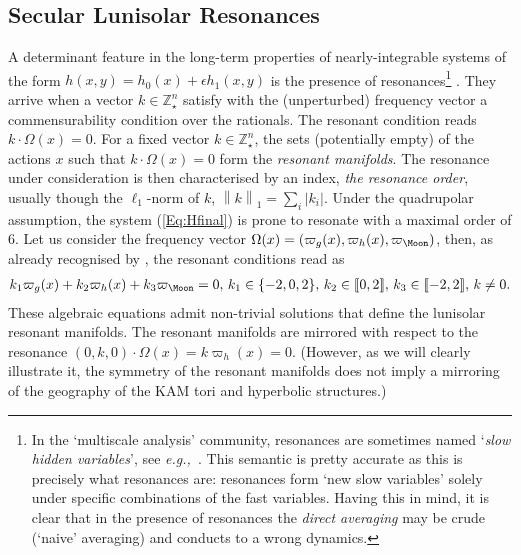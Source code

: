 \documentclass{amsart}
\theoremstyle{definition}
\theoremstyle{remark}
\numberwithin{equation}{section}
\newcommand{\norm}[1]{\left\lVert#1\right\rVert}
\newcommand{\eg}{\textit{e.g.,\ }}
\begin{document}
\subsection{Secular Lunisolar Resonances}
A determinant feature in the long-term properties of nearly-integrable systems of the form 
$h(x,y) = h_{0}(x) + \epsilon h_{1}(x,y)$ is the presence of resonances\footnote{In the `multiscale analysis' community, resonances are sometimes named `\textit{slow hidden variables}', see \eg \cite{gAr09,aAb12}. This semantic is pretty accurate as this is precisely what resonances are: resonances form `new slow variables' solely  under specific combinations of the fast variables. Having this in mind, it is clear that in the presence of resonances the \textit{direct averaging} may be crude (`naive' averaging) and conducts to a wrong dynamics. 
} \citep{pLo02}. They arrive when a vector $k \in \mathbb{Z}_{\star}^{n}$
satisfy with the (unperturbed) frequency vector  a commensurability condition over the {\color{black}rationals}. 
The resonant condition reads  
$k \cdot \Omega(x)  = 0$. For a fixed vector $k \in \mathbb{Z}_{\star}^{n} $, the sets (potentially empty) of the actions $x$ such that $k \cdot \Omega(x) = 0$ form the \textit{resonant manifolds}.  The resonance under consideration is then characterised by an index, \textit{the resonan{\color{black}ce} order}, usually though the $\ell_{1}$-norm of $k$,
$ \norm{k}_{1}= \sum_{i}\vert k_{i}\vert$. 
Under the quadrupolar assumption, the system (\ref{Eq:Hfinal}) is prone to resonate
with a maximal order of $6$. Let us consider the frequency vector $\Omega(x)=(\varpi_{g}(x),\varpi_{h}(x),\varpi_{\Moon})$, then, as already recognised by \cite{tEl96}, the resonant conditions read as
\begin{align}\label{Eq:ResCond}
	k_{1} \varpi_{g}(x) + k_{2} \varpi_{h}(x) + k_{3} \varpi_{\Moon} = 0, \, k_{1} \in \{-2,0,2\}, \, k_{2} \in  \llbracket 0,2\rrbracket, \, k_{3} \in  \llbracket-2,2\rrbracket, \, k \neq 0.
\end{align}
These algebraic equations admit non-trivial solutions that define the lunisolar resonant manifolds.  The resonant manifolds are mirrored with respect to the resonance $(0,k,0) \cdot \Omega(x)=k\varpi_{h}(x)=0$. (However, as we will clearly illustrate it, the symmetry of the resonant manifolds does not imply a mirroring of the geography of the KAM tori and hyperbolic structures.)  
\end{document}
